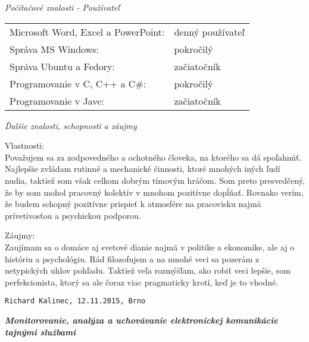 \documentclass{article}
\begin{document}
\begin{flushleft}
\bigskip

\Large
\textit{\textsf{Počítačové znalosti - Používateľ\\}}
\normalsize

\smallskip

\begin{adjustwidth}{-6pt}{}
	\begin{tabular}{l l}
		Microsoft Word, Excel a PowerPoint: & denný používateľ \\
		Správa MS Windows: & pokročilý \\
		Správa Ubuntu a Fedory: & začiatočník \\
		Programovanie v C, C++ a C\#: & pokročilý \\
		Programovanie v Jave: & začiatočník
	\end{tabular}
\end{adjustwidth}

\bigskip

\Large
\textit{\textsf{Ďalšie znalosti, schopnosti a záujmy\\}}
\normalsize

\smallskip

Vlastnosti:\\
Považujem sa za zodpovedného a ochotného človeka, na ktorého sa dá spoľahnúť. Najlepšie zvládam rutinné a mechanické činnosti, ktoré mnohých iných ľudí nudia, taktiež som však celkom dobrým tímovým hráčom. Som preto presvedčený, že by som mohol pracovný kolektív v mnohom pozitívne dopĺňať. Rovnako verím, že budem schopný pozitívne prispieť k atmosfére na pracovisku najmä prívetivosťou a psychickou podporou.

\smallskip

Záujmy:\\
Zaujímam sa o domáce aj svetové dianie najmä v politike a ekonomike,
ale aj o históriu a psychológiu. Rád filozofujem a na mnohé veci sa
pozerám z netypických uhlov pohľadu. Taktiež veľa rozmýšľam, ako robiť veci lepšie, som perfekcionista, ktorý sa ale čoraz viac pragmaticky krotí, keď je to vhodné.\\

\bigskip

\texttt{Richard Kalinec, 12.11.2015, Brno}

\pagebreak
\end{flushleft}
\begin{center}
\Huge
\textbf{\textit{Monitorovanie, analýza a uchovávanie elektronickej komunikácie tajnými službami}}\\
\normalsize
\end{center}
\end{document}
